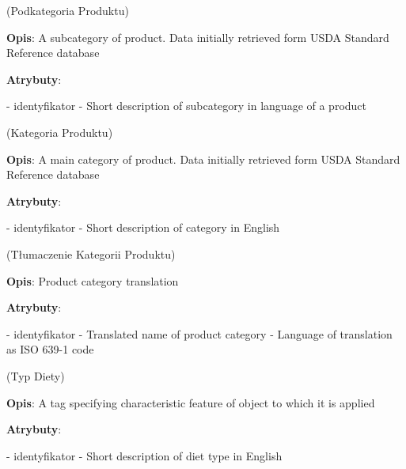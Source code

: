 \begin{enumerate}[label={\textbf{KAT/\protect\threedigits{\theenumi}}}, wide, labelwidth=!, labelindent=0pt, labelsep=0pt, series=reqs]
     \label{kat:ProductSubcategory} (Podkategoria Produktu)

    \textbf{Opis}: A subcategory of product. Data initially retrieved form USDA Standard Reference database
    \par
    \textbf{Atrybuty}:
    \begin{itemize}[series=atr, wide, align=left, leftmargin=190pt]
         \label{kat:ProductSubcategory:id} - identyfikator
         \label{kat:ProductSubcategory:description} - Short description of subcategory in language of a product
    \end{itemize}

     \label{kat:ProductCategory} (Kategoria Produktu)

    \textbf{Opis}: A main category of product. Data initially retrieved form USDA Standard Reference database
    \par
    \textbf{Atrybuty}:
    \begin{itemize}[series=atr, wide, align=left, leftmargin=190pt]
         \label{kat:ProductCategory:id} - identyfikator
         \label{kat:ProductCategory:description} - Short description of category in English
    \end{itemize}

     \label{kat:ProductCategoryTranslation} (Tłumaczenie Kategorii Produktu)

    \textbf{Opis}: Product category translation
    \par
    \textbf{Atrybuty}:
    \begin{itemize}[series=atr, wide, align=left, leftmargin=190pt]
         \label{kat:ProductCategoryTranslation:id} - identyfikator
         \label{kat:ProductCategoryTranslation:translation} - Translated name of product category
         \label{kat:ProductCategoryTranslation:language} - Language of translation as ISO 639-1 code
    \end{itemize}

     \label{kat:DietType} (Typ Diety)

    \textbf{Opis}: A tag specifying characteristic feature of object to which it is applied
    \par
    \textbf{Atrybuty}:
    \begin{itemize}[series=atr, wide, align=left, leftmargin=190pt]
         \label{kat:DietType:id} - identyfikator
         \label{kat:DietType:name} - Short description of diet type in English
    \end{itemize}


\end{enumerate}
